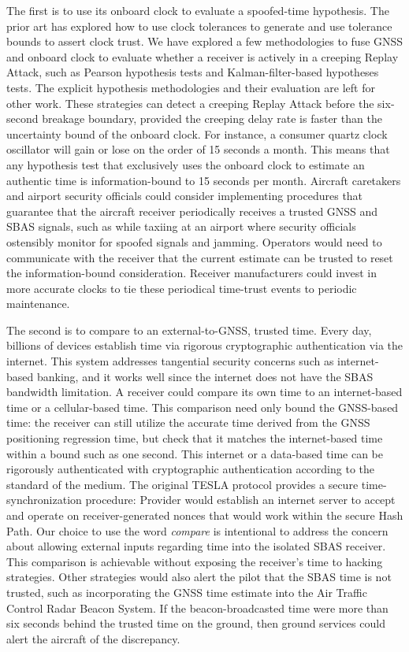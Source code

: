 \documentclass[letterpaper,times]{IONconf/IONconf}
\begin{document}
	The first is to use its onboard clock to evaluate a spoofed-time hypothesis.
	The prior art has explored how to use clock tolerances to generate and use tolerance bounds to assert clock trust\cite{time_sync_paper}.
	We have explored a few methodologies to fuse GNSS and onboard clock to evaluate whether a receiver is actively in a creeping Replay Attack, such as Pearson hypothesis tests and Kalman-filter-based hypotheses tests.
	The explicit hypothesis methodologies and their evaluation are left for other work.
	These strategies can detect a creeping Replay Attack before the six-second breakage boundary, provided the creeping delay rate is faster than the uncertainty bound of the onboard clock.
	For instance, a consumer quartz clock oscillator will gain or lose on the order of 15 seconds a month.
	This means that any hypothesis test that exclusively uses the onboard clock to estimate an authentic time is information-bound to 15 seconds per month.
	Aircraft caretakers and airport security officials could consider implementing procedures that guarantee that the aircraft receiver periodically receives a trusted GNSS and SBAS signals, such as while taxiing at an airport where security officials ostensibly monitor for spoofed signals and jamming.
	Operators would need to communicate with the receiver that the current estimate can be trusted to reset the information-bound consideration.
	Receiver manufacturers could invest in more accurate clocks to tie these periodical time-trust events to periodic maintenance.

	The second is to compare to an external-to-GNSS, trusted time.
	Every day, billions of devices establish time via rigorous cryptographic authentication via the internet.
	This system addresses tangential security concerns such as internet-based banking, and it works well since the internet does not have the SBAS bandwidth limitation.
	A receiver could compare its own time to an internet-based time or a cellular-based time.
	This comparison need only bound the GNSS-based time: the receiver can still utilize the accurate time derived from the GNSS positioning regression time, but check that it matches the internet-based time within a bound such as one second.
	This internet or a data-based time can be rigorously authenticated with cryptographic authentication according to the standard of the medium.
	The original TESLA protocol provides a secure time-synchronization procedure: Provider would establish an internet server to accept and operate on receiver-generated nonces that would work within the secure Hash Path\cite{perrig2005timed}.
	Our choice to use the word {\em compare} is intentional to address the concern about allowing external inputs regarding time into the isolated SBAS receiver.
	This comparison is achievable without exposing the receiver's time to hacking strategies.
	Other strategies would also alert the pilot that the SBAS time is not trusted, such as incorporating the GNSS time estimate into the Air Traffic Control Radar Beacon System.
	If the beacon-broadcasted time were more than six seconds behind the trusted time on the ground, then ground services could alert the aircraft of the discrepancy.
\end{document}
